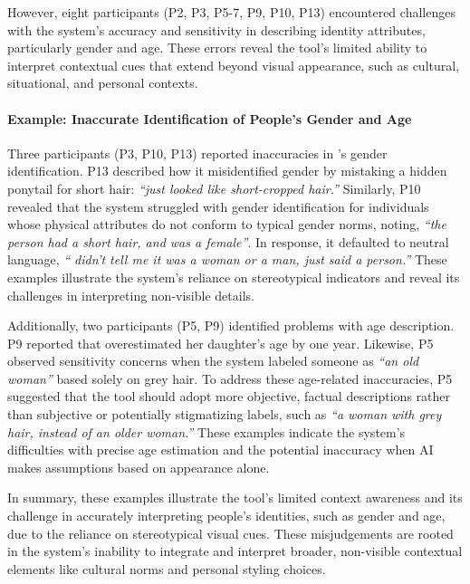 However, eight participants (P2, P3, P5-7, P9, P10, P13) encountered challenges with the system's accuracy and sensitivity in describing identity attributes, particularly gender and age. 
% 
These errors reveal the tool's limited ability to interpret contextual cues that extend beyond visual appearance, such as cultural, situational, and personal contexts. 



\paragraph{Example: Inaccurate Identification of People's Gender and Age}


Three participants (P3, P10, P13) reported inaccuracies in \sbma's gender identification. 
P13 described how it misidentified gender by mistaking a hidden ponytail for short hair: \textit{``just looked like short-cropped hair.''} 
% 
Similarly, P10 revealed that the system struggled with gender identification for individuals whose physical attributes do not conform to typical gender norms, noting, \textit{``the person had a short hair, and was a female''}. 
In response, it defaulted to neutral language, \textit{``\bma{} didn't tell me it was a woman or a man, just said a person.''}
% 
These examples illustrate the system's reliance on stereotypical indicators and reveal its challenges in interpreting non-visible details.



Additionally, two participants (P5, P9) identified problems with age description. P9 reported that \bma{} overestimated her daughter's age by one year. 
% 
Likewise, P5 observed sensitivity concerns when the system labeled someone as \textit{``an old woman''} based solely on grey hair. 
% 
To address these age-related inaccuracies, P5 suggested that the tool should adopt more objective, factual descriptions rather than subjective or potentially stigmatizing labels, such as \textit{``a woman with grey hair, instead of an older woman.''}
% 
These examples indicate the system's difficulties with precise age estimation and the potential inaccuracy when AI makes assumptions based on appearance alone.



In summary, these examples illustrate the tool's limited context awareness and its challenge in accurately interpreting people's identities, such as gender and age, due to the reliance on stereotypical visual cues. These misjudgements are rooted in the system's inability to integrate and interpret broader, non-visible contextual elements like cultural norms and personal styling choices. 








